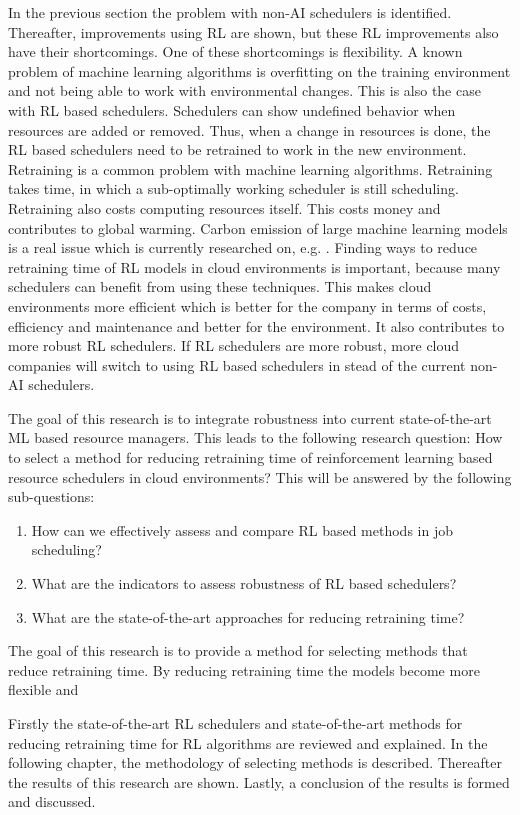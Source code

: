 In the previous section the problem with non-AI schedulers is identified.
Thereafter, improvements using RL are shown, but these RL improvements also
have their shortcomings. One of these shortcomings is flexibility. A known
problem of machine learning algorithms is overfitting on the training
environment and not being able to work with environmental changes. This is
also the case with RL based schedulers. Schedulers can show undefined behavior
when resources are added or removed. Thus, when a change in resources is done,
the RL based schedulers need to be retrained to work in the new environment.
Retraining is a common problem with machine learning algorithms. Retraining
takes time, in which a sub-optimally working scheduler is still scheduling.
Retraining also costs computing resources itself. This costs money and
contributes to global warming. Carbon emission of large machine learning
models is a real issue which is currently researched on, e.g.
. Finding ways to reduce retraining time of RL models in
cloud environments is important, because many schedulers can benefit from
using these techniques. This makes cloud environments more efficient which is
better for the company in terms of costs, efficiency and maintenance and
better for the environment. It also contributes to more robust RL schedulers.
If RL schedulers are more robust, more cloud companies will switch to using RL
based schedulers in stead of the current non-AI schedulers.

The goal of this research is to integrate robustness into current
state-of-the-art ML based resource managers. This leads to the following
research question: How to select a method for reducing retraining time of
reinforcement learning based resource schedulers in cloud environments? This
will be answered by the following sub-questions:

\begin{enumerate}
    \item How can we effectively assess and compare RL based methods in job
        scheduling?
    \item What are the indicators to assess robustness of RL based schedulers?
    \item What are the state-of-the-art approaches for reducing retraining time?
\end{enumerate}


The goal of this research is to provide a method for selecting methods that
reduce retraining time. By reducing retraining time the models become more
flexible and


Firstly the state-of-the-art RL schedulers and state-of-the-art methods for
reducing retraining time for RL algorithms are reviewed and explained. In the
following chapter, the methodology of selecting methods is described.
Thereafter the results of this research are shown. Lastly, a conclusion of the
results is formed and discussed.
